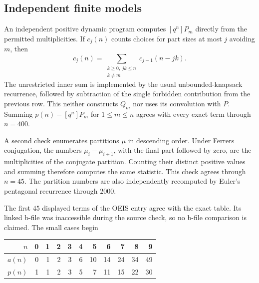 \documentclass[11pt,letterpaper]{article}
\numberwithin{equation}{section}
\theoremstyle{definition}\newtheorem{definition}[theorem]{Definition}
\theoremstyle{remark}\newtheorem{remark}[theorem]{Remark}
\begin{document}
\subsection{Independent finite models}
An independent positive dynamic program computes $[q^n]P_m$ directly from the permitted multiplicities. If $c_j(n)$ counts choices for part sizes at most $j$ avoiding $m$, then
\begin{equation}\label{dmv:cnt:eq:positiveDP}
c_j(n)=\sum_{\substack{k\ge0,\ jk\le n\\k\ne m}}c_{j-1}(n-jk).
\end{equation}
The unrestricted inner sum is implemented by the usual unbounded-knapsack recurrence, followed by subtraction of the single forbidden contribution from the previous row. This neither constructs $Q_m$ nor uses its convolution with $P$. Summing $p(n)-[q^n]P_m$ for $1\le m\le n$ agrees with every exact term through $n=400$.

A second check enumerates partitions $\mu$ in descending order. Under Ferrers conjugation, the numbers $\mu_i-\mu_{i+1}$, with the final part followed by zero, are the multiplicities of the conjugate partition. Counting their distinct positive values and summing therefore computes the same statistic. This check agrees through $n=45$. The partition numbers are also independently recomputed by Euler's pentagonal recurrence through $2000$.

The first $45$ displayed terms of the OEIS entry agree with the exact table. Its linked b-file was inaccessible during the source check, so no b-file comparison is claimed. The small cases begin
\begin{center}
\begin{tabular}{@{}rrrrrrrrrrr@{}}\toprule
$n$ & 0&1&2&3&4&5&6&7&8&9\\\midrule
$a(n)$ &0&1&2&3&6&10&14&24&34&49\\
$p(n)$ &1&1&2&3&5&7&11&15&22&30\\\bottomrule
\end{tabular}
\end{center}
\end{document}
